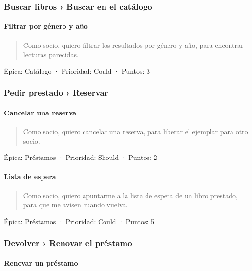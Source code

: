 \documentclass[11pt,a4paper]{article}
\begin{document}
\subsubsection*{Buscar libros › Buscar en el catálogo}

\paragraph*{Filtrar por género y año}

\begin{quote}
Como socio, quiero filtrar los resultados por género y año, para encontrar lecturas parecidas.
\end{quote}

Épica: Catálogo · Prioridad: Could · Puntos: 3

\subsubsection*{Pedir prestado › Reservar}

\paragraph*{Cancelar una reserva}

\begin{quote}
Como socio, quiero cancelar una reserva, para liberar el ejemplar para otro socio.
\end{quote}

Épica: Préstamos · Prioridad: Should · Puntos: 2

\paragraph*{Lista de espera}

\begin{quote}
Como socio, quiero apuntarme a la lista de espera de un libro prestado, para que me avisen cuando vuelva.
\end{quote}

Épica: Préstamos · Prioridad: Could · Puntos: 5

\subsubsection*{Devolver › Renovar el préstamo}

\paragraph*{Renovar un préstamo}
\end{document}
